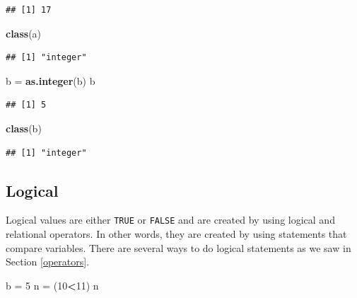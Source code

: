 \documentclass[
]{book}
\newenvironment{Shaded}{\begin{snugshade}}{\end{snugshade}}
\newcommand{\DecValTok}[1]{\textcolor[rgb]{0.00,0.00,0.81}{#1}}
\newcommand{\KeywordTok}[1]{\textcolor[rgb]{0.13,0.29,0.53}{\textbf{#1}}}
\newcommand{\NormalTok}[1]{#1}
\newcommand{\OperatorTok}[1]{\textcolor[rgb]{0.81,0.36,0.00}{\textbf{#1}}}
\newcommand{\StringTok}[1]{\textcolor[rgb]{0.31,0.60,0.02}{#1}}
\begin{document}
\begin{verbatim}
## [1] 17
\end{verbatim}

\begin{Shaded}
\begin{Highlighting}[]
\KeywordTok{class}\NormalTok{(a)}
\end{Highlighting}
\end{Shaded}

\begin{verbatim}
## [1] "integer"
\end{verbatim}

\begin{Shaded}
\begin{Highlighting}[]
\NormalTok{b =}\StringTok{ }\KeywordTok{as.integer}\NormalTok{(b)}
\NormalTok{b }
\end{Highlighting}
\end{Shaded}

\begin{verbatim}
## [1] 5
\end{verbatim}

\begin{Shaded}
\begin{Highlighting}[]
\KeywordTok{class}\NormalTok{(b)}
\end{Highlighting}
\end{Shaded}

\begin{verbatim}
## [1] "integer"
\end{verbatim}

\hypertarget{logical}{%
\subsection*{Logical}\label{logical}}

Logical values are either \texttt{TRUE} or \texttt{FALSE} and are created by using logical and relational operators. In other words, they are created by using statements that compare variables. There are several ways to do logical statements as we saw in Section \ref{operators}.

\begin{Shaded}
\begin{Highlighting}[]
\NormalTok{b =}\StringTok{ }\DecValTok{5}
\NormalTok{n =}\StringTok{ }\NormalTok{(}\DecValTok{10}\OperatorTok{<}\DecValTok{11}\NormalTok{)}
\NormalTok{n}
\end{Highlighting}
\end{Shaded}
\end{document}
